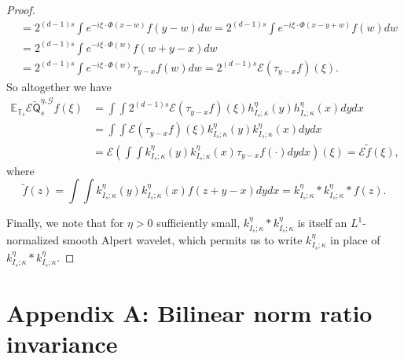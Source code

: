 \documentclass{amsart}%
\theoremstyle{plain}
\numberwithin{equation}{section}
\begin{document}
\begin{proof}
\begin{align*}
& =2^{\left(  d-1\right)  s}\int e^{-i\xi\cdot\Phi\left(  x-w\right)
}f\left(  y-w\right)  dw=2^{\left(  d-1\right)  s}\int e^{-i\xi\cdot
\Phi\left(  x-y+w\right)  }f\left(  w\right)  dw\\
& =2^{\left(  d-1\right)  s}\int e^{-i\xi\cdot\Phi\left(  w\right)  }f\left(
w+y-x\right)  dw\\
& =2^{\left(  d-1\right)  s}\int e^{-i\xi\cdot\Phi\left(  w\right)  }%
\tau_{y-x}f\left(  w\right)  dw=2^{\left(  d-1\right)  s}\mathcal{E}\left(
\tau_{y-x}f\right)  \left(  \xi\right)  .
\end{align*}
So altogether we have
\begin{align*}
\mathbb{E}_{\mathbb{T}_{s}}\mathcal{E}\widetilde{\mathsf{Q}}_{s}%
^{\eta,\mathcal{G}}f\left(  \xi\right)   & =\int\int2^{\left(  d-1\right)
s}\mathcal{E}\left(  \tau_{y-x}f\right)  \left(  \xi\right)  h_{I_{s};\kappa
}^{\eta}\left(  y\right)  h_{I_{s};\kappa}^{\eta}\left(  x\right)  dydx\\
& =\int\int\mathcal{E}\left(  \tau_{y-x}f\right)  \left(  \xi\right)
k_{I_{s};\kappa}^{\eta}\left(  y\right)  k_{I_{s};\kappa}^{\eta}\left(
x\right)  dydx\\
& =\mathcal{E}\left(  \int\int k_{I_{s};\kappa}^{\eta}\left(  y\right)
k_{I_{s};\kappa}^{\eta}\left(  x\right)  \tau_{y-x}f\left(  \cdot\right)
dydx\right)  \left(  \xi\right)  =\mathcal{E}\widetilde{f}\left(  \xi\right)
,
\end{align*}
where%
\[
\widetilde{f}\left(  z\right)  =\int\int k_{I_{s};\kappa}^{\eta}\left(
y\right)  k_{I_{s};\kappa}^{\eta}\left(  x\right)  f\left(  z+y-x\right)
dydx=k_{I_{s};\kappa}^{\eta}\ast k_{I_{s};\kappa}^{\eta}\ast f\left(
z\right)  .
\]


Finally, we note that for $\eta>0$ sufficiently small, $k_{I_{s};\kappa}%
^{\eta}\ast k_{I_{s};\kappa}^{\eta}$ is itself an $L^{1}$-normalized smooth
Alpert wavelet, which permits us to write $k_{I_{s};\kappa}^{\eta}$ in place
of $k_{I_{s};\kappa}^{\eta}\ast k_{I_{s};\kappa}^{\eta}$.
\end{proof}

\section{Appendix A: Bilinear norm ratio invariance}
\end{document}
